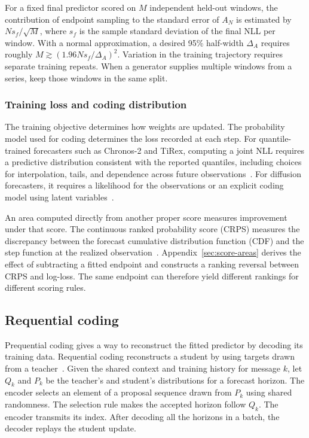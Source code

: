 \documentclass[10pt,a4paper]{article}
\theoremstyle{definition}
\begin{document}
For a fixed final predictor scored on $M$ independent held-out windows,
the contribution of endpoint sampling to the standard error of $A_N$ is
estimated by $Ns_f/\sqrt M$, where $s_f$ is the sample standard deviation of
the final NLL per window. With a normal approximation, a desired 95\%
half-width $\Delta_A$ requires roughly $M\gtrsim(1.96Ns_f/\Delta_A)^2$.
Variation in the training trajectory requires separate training repeats.
When a generator supplies multiple windows from a series, keep those
windows in the same split.

\subsubsection{Training loss and coding distribution}
The training objective determines how weights are updated. The probability
model used for coding determines the loss recorded at each step. For
quantile-trained forecasters such as Chronos-2 and TiRex, computing a joint
NLL requires a predictive distribution consistent with the reported
quantiles, including choices for interpolation, tails, and dependence
across future observations~\cite{ansari2025chronos2,auer2025}. For diffusion
forecasters, it requires a likelihood for the observations or an explicit
coding model using latent variables~\cite{kingma2023}.

An area computed directly from another proper score measures improvement
under that score. The continuous ranked probability score (CRPS) measures
the discrepancy between the forecast cumulative distribution function
(CDF) and the step function at the realized observation~\cite{gneiting2007}.
Appendix~\ref{sec:score-areas}
derives the effect of subtracting a fitted endpoint and constructs a
ranking reversal between CRPS and log-loss. The same endpoint can
therefore yield different rankings for different scoring rules.

\subsection{Requential coding}\label{sec:requential}
Prequential coding gives a way to reconstruct the fitted predictor by
decoding its training data. Requential coding reconstructs a student by
using targets drawn from a teacher~\cite{qiu2026}. Given the shared context
and training history for message $k$, let $Q_k$ and $P_k$ be the teacher's and
student's distributions for a forecast horizon. The encoder selects an
element of a proposal sequence drawn from $P_k$ using shared randomness.
The selection rule makes the accepted horizon follow $Q_k$. The encoder
transmits its index. After decoding all the horizons in a batch, the decoder
replays the student update.
\end{document}
